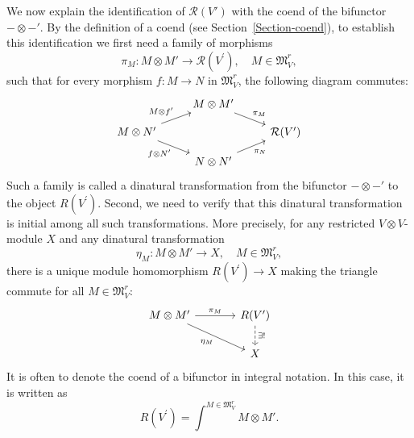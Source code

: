 \documentclass[12pt, english]{article}
\numberwithin{equation}{section}
\theoremstyle{plain}
\theoremstyle{definition}
\theoremstyle{remark}
\begin{document}
	
	We now explain the identification of $\mathcal{R}(V')$ with the coend of the bifunctor $ -\otimes -'$.
	By the definition of a coend (see Section~\ref{Section-coend}), to establish this identification we first need a family of morphisms
	\[
	\pi_M\colon M\otimes M' \to \mathcal R(V^\prime), \quad M \in \mathfrak{M}^r_V,
	\]
	such that for every morphism $f\colon M \to N$ in $\mathfrak{M}^r_V$,  the following diagram commutes:
	\[
	\begin{tikzcd}[row sep=small]
		& M\otimes M' \arrow[dr, "\pi_M"] & \\
		M\otimes N'
		\arrow[ur, "M\otimes f'"]
		\arrow[dr, "f\otimes{N'}"']
		& & \mathcal R(V^\prime) \\
		& N\otimes N' \arrow[ur, "\pi_N"'] &
	\end{tikzcd}
	\]
	Such a family is called a dinatural transformation from the bifunctor $-\otimes -'$ to the object $R(V^\prime)$. 
	Second, we need to verify that this dinatural transformation is initial among all such transformations. 
	More precisely, for any restricted $V\otimes V$-module $X$ and any dinatural transformation 
	\[
	\eta_M\colon M\otimes M' \to X, \quad M \in \mathfrak{M}^r_V,
	\]
	there is a unique module homomorphism $ R(V^\prime) \to X$ making the triangle commute for all $M\in\mathfrak{M}^r_V$:
	\[
	\begin{tikzcd}[column sep=large]
		M\otimes M'
		\arrow[r, "\pi_M"]
		\arrow[dr, "\eta_M"']
		&  R(V^\prime) \arrow[d, dashed, "{\exists!}"] \\
		& X
	\end{tikzcd}
	\]
	It is often to denote the coend of a bifunctor in integral notation. In this case, it is written as
	\[
	R(V^\prime) = \int^{M\in\mathfrak{M}^r_V} M\otimes M'.
	\]
	
\end{document}
